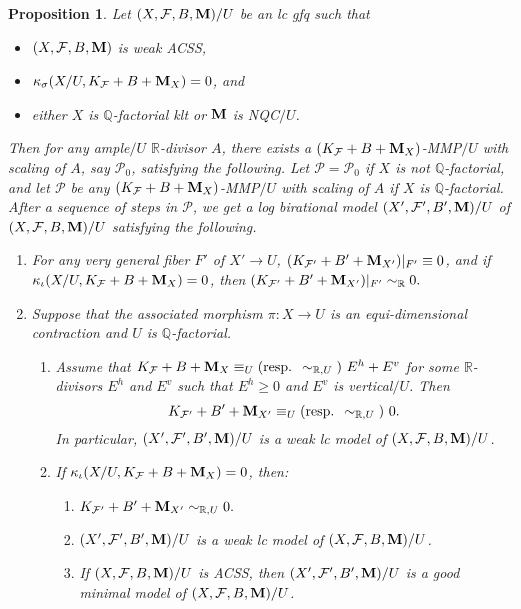 \documentclass[11pt]{amsart}
\numberwithin{equation}{section}
\newcommand{\Mm}{{\bf{M}}}
\newcommand{\Qq}{\mathbb{Q}}
\newcommand{\Rr}{\mathbb{R}}
\newcommand{\Ff}{\mathcal{F}}
\newtheorem{prop}[thm]{Proposition}
\theoremstyle{definition}
\theoremstyle{definition}
\theoremstyle{definition}
\begin{document}
\begin{prop}\label{prop: weak ss num 0 mmp}
    Let $(X,\Ff,B,\Mm)/U$ be an lc gfq such that
    \begin{itemize}
        \item $(X,\Ff,B,\Mm)$ is weak ACSS,
        \item $\kappa_{\sigma}(X/U,K_{\Ff}+B+\Mm_X)=0$, and
        \item either $X$ is $\Qq$-factorial klt or $\Mm$ is NQC$/U$.
    \end{itemize}
 Then for any ample$/U$ $\Rr$-divisor $A$, there exists a $(K_{\Ff}+B+\Mm_X)$-MMP$/U$ with scaling of $A$, say $\mathcal{P}_0$, satisfying the following. Let $\mathcal{P}=\mathcal{P}_0$ if $X$ is not $\Qq$-factorial, and let $\mathcal{P}$ be any $(K_{\Ff}+B+\Mm_X)$-MMP$/U$ with scaling of $A$ if $X$ is $\Qq$-factorial. After a sequence of steps in $\mathcal{P}$, we get a log birational model $(X',\Ff',B',\Mm)/U$ of $(X,\Ff,B,\Mm)/U$ satisfying the following.
    \begin{enumerate}
        \item For any very general fiber $F'$ of $X'\rightarrow U$, $(K_{\Ff'}+B'+\Mm_{X'})|_{F'}\equiv 0$, and if $\kappa_{\iota}(X/U,K_{\Ff}+B+\Mm_X)=0$, then $(K_{\Ff'}+B'+\Mm_{X'})|_{F'}\sim_{\mathbb R}0.$
        \item Suppose that the associated morphism $\pi:X\to U$ is an equi-dimensional contraction and $U$ is $\Qq$-factorial. 
        \begin{enumerate}
            \item Assume that $K_{\Ff}+B+\Mm_X\equiv_U\text{(resp. }\sim_{\mathbb R,U}\text{) }E^h+E^v$ for some $\Rr$-divisors $E^h$ and $E^v$ such that $E^h\geq 0$ and $E^v$ is vertical$/U$. Then
            $$K_{\Ff'}+B'+\Mm_{X'}\equiv_U\text{(resp. }\sim_{\mathbb R,U}\text{) }0.$$
            In particular, $(X',\Ff',B',\Mm)/U$ is a weak lc model of $(X,\Ff,B,\Mm)/U$.
            \item If $\kappa_{\iota}(X/U,K_{\Ff}+B+\Mm_X)=0$, then:
            \begin{enumerate}
                \item $K_{\Ff'}+B'+\Mm_{X'}\sim_{\mathbb R,U}0.$
                \item $(X',\Ff',B',\Mm)/U$ is a weak lc model of $(X,\Ff,B,\Mm)/U$.
                \item If $(X,\Ff,B,\Mm)/U$ is ACSS, then $(X',\Ff',B',\Mm)/U$ is a good minimal model of $(X,\Ff,B,\Mm)/U$.
            \end{enumerate}
        \end{enumerate}
    \end{enumerate}
\end{prop}
\end{document}
